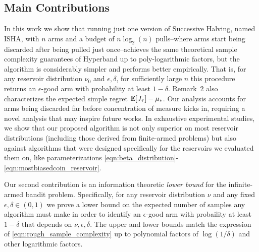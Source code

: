 \subsection{Main Contributions}
In this work we show that running just one version of Successive Halving, named ISHA, with $n$ arms and a budget of $n\log_2(n)$ pulls--where arms start being discarded after being pulled just once--achieves the same theoretical sample complexity guarantees of Hyperband up to poly-logarithmic factors, but the algorithm is considerably simpler and performs better empirically.
That is, for any reservoir distribution $\nu_0$ and $\epsilon,\delta$, for sufficiently large $n$ this procedure returns an $\epsilon$-good arm with probability at least $1-\delta$.
Remark~2 also characterizes the expected simple regret $\mathbb{E}[J_{\tau}]-\mu_*$. 
Our analysis accounts for arms being discarded far before concentration of measure kicks in, requiring a novel analysis that may inspire future works.
In exhaustive experimental studies, we show that our proposed algorithm is not only superior on most reservoir distributions (including those derived from finite-armed problems) but also against algorithms that were designed specifically for the reservoirs we evaluated them on, like parameterizations \eqref{eqn:beta_distribution}-\eqref{eqn:mostbiasedcoin_reservoir}.

Our second contribution is an information theoretic \emph{lower bound} for the infinite-armed bandit problem. 
Specifically, for any reservoir distribution $\nu$ and any fixed $\epsilon,\delta \in (0,1)$ we prove a lower bound on the expected number of samples any algorithm must make in order to identify an $\epsilon$-good arm with probaility at least $1-\delta$ that depends on $\nu,\epsilon,\delta$. 
The upper and lower bounds match the expression of \eqref{eqn:rough_sample_complexity} up to polynomial factors of $\log(1/\delta)$ and other logarithmic factors.  



